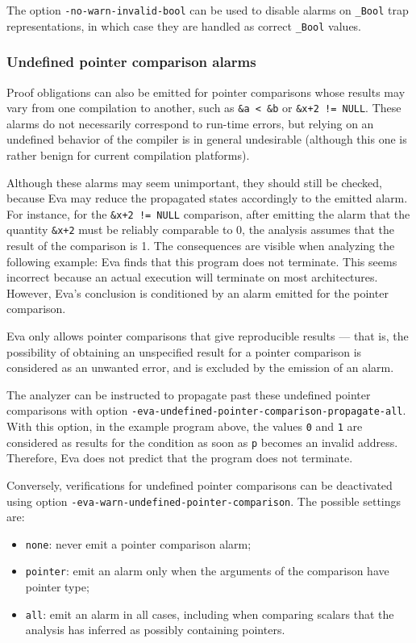 \documentclass[web]{frama-c-book}
\newcommand{\Eva}{\textsf{Eva}}
\begin{document}
The option \lstinline|-no-warn-invalid-bool| can be used to disable alarms
on \texttt{\_Bool} trap representations, in which case they are handled as
correct \texttt{\_Bool} values.

\subsubsection{Undefined pointer comparison alarms}
Proof obligations can also be emitted 
for pointer comparisons whose results may vary
from one compilation to another, such as \lstinline|&a < &b|
or \lstinline|&x+2 != NULL|. 
These alarms do not necessarily
correspond to run-time errors, but relying on an undefined
behavior of the compiler is in general undesirable (although
this one is rather benign for current compilation platforms).

Although these alarms may seem unimportant, they should still be
checked, because \Eva{} may reduce the propagated states
accordingly to the emitted alarm. For instance, for the
\lstinline|&x+2 != NULL| comparison, after emitting the alarm that the
quantity \lstinline|&x+2| must be reliably comparable to 0, the
analysis assumes that the result of the comparison is 1. The
consequences are visible when analyzing the following example:
\Eva{} finds that this program does not terminate.
This seems incorrect because an actual execution will terminate
on most architectures.
However, \Eva{}'s conclusion is conditioned by
an alarm emitted for the pointer comparison.

\Eva{} only allows pointer comparisons that give
reproducible results --- that is, the possibility of obtaining an
unspecified result for a pointer comparison is considered as an
unwanted error, and is excluded by the emission of an alarm.

The analyzer can be instructed to propagate past these undefined
pointer comparisons with
option \lstinline|-eva-undefined-pointer-comparison-propagate-all|. 
With this option, in the example program above,
the values \lstinline|0| and \lstinline|1| are considered as results
for the condition as soon as \lstinline|p| becomes an invalid address.
Therefore, \Eva{} does not predict that the program
does not terminate.

Conversely, verifications for undefined pointer comparisons can be
deactivated using option \lstinline|-eva-warn-undefined-pointer-comparison|.
The possible settings are:
\begin{itemize}
\item \lstinline|none|: never emit a pointer comparison alarm;
\item \lstinline|pointer|: emit an alarm only when the arguments of the
comparison have pointer type;
\item \lstinline|all|: emit an alarm in all cases, including when comparing
scalars that the analysis has inferred as possibly containing pointers.
\end{itemize}
 
\end{document}
